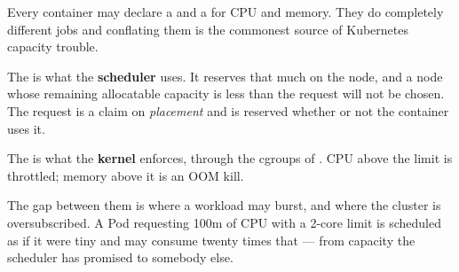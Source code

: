 Every container may declare a  and a  for CPU and
memory. They do completely different jobs and conflating them is the commonest
source of Kubernetes capacity trouble.

\begin{definitionbox}
The  is what the \textbf{scheduler} uses. It reserves that much
on the node, and a node whose remaining allocatable capacity is less than the
request will not be chosen. The request is a claim on \emph{placement} and is
reserved whether or not the container uses it.

\smallskip
The  is what the \textbf{kernel} enforces, through the cgroups of
. CPU above the limit is throttled; memory above it is an OOM
kill.

\smallskip
The gap between them is where a workload may burst, and where the cluster is
oversubscribed. A Pod requesting 100m of CPU with a 2-core limit is scheduled
as if it were tiny and may consume twenty times that --- from capacity the
scheduler has promised to somebody else.
\end{definitionbox}

